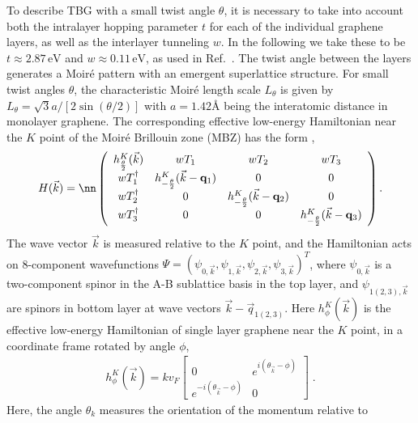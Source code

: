 To describe TBG with a small twist angle  $\theta$, it is necessary to take into account both the intralayer hopping parameter $t$ for each of the individual graphene layers, as well as the interlayer tunneling $w$. In the following we take these to be $t\approx 2.87 \,\text{eV}$ and $w\approx 0.11 \,\text{eV}$, as used in Ref.~\cite{Bistritzer2011}. The twist angle between the layers generates a Moir\'{e} pattern with an emergent superlattice structure. For small twist angles $\theta$, the characteristic Moir\'{e} length scale $L_{\theta}$ is given by $L_{\theta}=\sqrt{3} a /[2 \sin (\theta / 2)]$ with $a=1.42\text{\AA}$ being the interatomic distance in monolayer graphene. The corresponding effective low-energy Hamiltonian near the $K$ point of the Moir\'{e} Brillouin zone (MBZ) has the form \cite{Bistritzer2011,Bernevig2019PRL-TBG},
\begin{align}
	\label{eq:H-TBG-full}
	&H(\vec{k})=\nn
	&\hspace{-0.3cm}\left(\begin{array}{cccc}
		h_{\frac{\theta}{2}}^{K}(\vec{k}) & w T_1 & w T_2 & w T_3 \\
		w T_1^{\dagger} & h_{-\frac{\theta}{2}}^{K}(\vec{k}-\mathbf{q}_1) & 0 & 0 \\
		w T_2^{\dagger} & 0 & h_{-\frac{\theta}{2}}^{K}(\vec{k}-\mathbf{q}_2) & 0 \\
		w T_3^{\dagger} & 0 & 0 & h_{-\frac{\theta}{2}}^{K}(\vec{k}-\mathbf{q}_3)
	\end{array}\right).
\end{align}
The wave vector $\vec{k}$ is measured relative to the $K$ point, and the Hamiltonian acts on 8-component wavefunctions $\Psi=\left(\psi_{0, \vec{k}}, \psi_{1, \vec{k}}, \psi_{2, \vec{k}}, \psi_{3, \vec{k}}\right)^T$, where $\psi_{0, \vec{k}}$ is a two-component spinor in the A-B sublattice basis in the top layer, and $\psi_{1(2,3), \vec{k}}$ are spinors in bottom layer at wave vectors $\vec{k}-\vec{q}_{1(2,3)}$.
Here $h_{\phi}^{K}(\vec{k})$ is the effective low-energy Hamiltonian of single layer graphene near the $K$ point, in a coordinate frame rotated by angle $\phi$,
\begin{align}
	h_{\phi}^K(\vec{k})=k v_F \left[\begin{array}{cc}
		0 & e^{i\left(\theta_{\vec{k}}-\phi\right)} \\
		e^{-i\left(\theta_{\vec{k}}-\phi\right)} & 0
	\end{array}\right]\;.
	\label{eq:hKtheta}
\end{align}
Here, the angle $\theta_k$ measures the orientation of the momentum relative to
